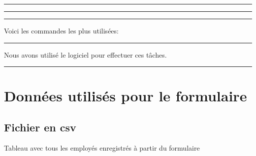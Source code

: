 \documentclass[letterpaper,10pt,french]{sphinxmanual}
\begin{document}
\bigskip\hrule\bigskip


\sphinxAtStartPar
{}
\begin{quote}

\sphinxAtStartPar
{}
\end{quote}


\bigskip\hrule\bigskip


\sphinxAtStartPar
{}
\begin{quote}

\sphinxAtStartPar
{}
\end{quote}


\bigskip\hrule\bigskip


\sphinxAtStartPar
Voici les commandes les plus utilisées:



\bigskip\hrule\bigskip


\sphinxAtStartPar
Nous avons utilisé le logiciel  pour effectuer ces tâches.



\bigskip\hrule\bigskip


\sphinxstepscope


\section{Données utilisés pour le formulaire}
\label{\detokenize{donnees:donnees-utilises-pour-le-formulaire}}\label{\detokenize{donnees::doc}}

\subsection{Fichier en csv}
\label{\detokenize{donnees:fichier-en-csv}}
\sphinxAtStartPar
Tableau avec tous les employés enregistrés à partir du formulaire
\end{document}
